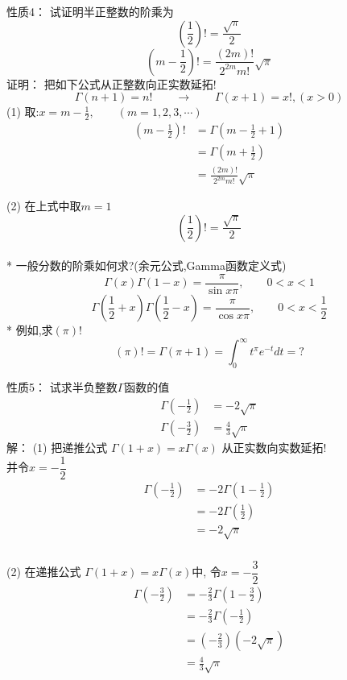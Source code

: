 \begin{frame}
	\alert{性质4：} 试证明半正整数的阶乘为
	\[(\frac{1}{2})! =  \frac{\sqrt{\pi}}{2}\]
	\[ (m-\frac{1}{2})! =\frac{(2m)!}{2^{2m} m!}\sqrt{\pi} \]
	\alert{证明：} 把如下公式从正整数向正实数延拓!
	\[\Gamma(n+1)=n!\qquad \to \qquad \Gamma(x+1)=x!, (x>0)\]
	(1) 取:$x=m-\frac{1}{2}, \qquad (m=1,2,3, \cdots )$
	\[ \begin{aligned}
		(m-\frac{1}{2})! &= \Gamma (m-\frac{1}{2}+1) \\
						 &= \Gamma (m+\frac{1}{2}) \\
						 &= \frac{(2m)!}{2^{2m} m!}\sqrt{\pi} 
	\end{aligned} \]
\end{frame}

\begin{frame}
	(2) 在上式中取$m=1$
	\[(\frac{1}{2})! =  \frac{\sqrt{\pi}}{2} \]
	~~ \\ \vspace{1em}
* 一般分数的阶乘如何求?(余元公式,Gamma函数定义式)
\[ \Gamma(x)  \Gamma(1-x) =\frac{\pi}{\sin x \pi}, \qquad  0<x<1 \]
\[ \Gamma(\frac{1}{2}+x)  \Gamma(\frac{1}{2}-x) =\frac{\pi}{\cos x \pi}, \qquad  0<x<\frac{1}{2} \]
 * 例如,求$(\pi) !$ 
 \[ (\pi)! = \Gamma(\pi +1 ) = \int_{0}^{\infty} t^{\pi} e^{-t} dt =? \]
\end{frame}

\begin{frame}
	\alert{性质5：} 试求半负整数$\Gamma$函数的值
	\begin{equation*}
		\begin{split}
		\Gamma(-\frac{1}{2}) &=-2\sqrt{\pi} \\ 
		\Gamma(-\frac{3}{2}) &=\frac{4}{3}\sqrt{\pi}
		\end{split}	
	\end{equation*}	
	\alert{解：} (1) 把递推公式 $\Gamma(1+x)=x \Gamma(x)$ 从正实数向实数延拓! \\
	并令$x=-\dfrac{1}{2}$\\
	\[
	\begin{aligned}
		 \Gamma(-\frac{1}{2})&= -2 \Gamma(1-\frac{1}{2})\\
		 &=-2 \Gamma(\frac{1}{2})\\
		 &=-2 \sqrt{\pi}
	\end{aligned}	
	\]
\end{frame}

\begin{frame}
	  \frametitle{}
	(2) 在递推公式 $\Gamma(1+x)=x \Gamma(x)$中, 令$x=-\dfrac{3}{2}$\\
	\[
	\begin{aligned}
		 \Gamma(-\frac{3}{2})&= -\frac{2}{3} \Gamma(1-\frac{3}{2})\\
		 &=-\frac{2}{3} \Gamma(-\frac{1}{2})\\
		 &=(-\frac{2}{3})(-2 \sqrt{\pi}) \\
		 &=\frac{4}{3}\sqrt{\pi} \\
	\end{aligned}	
	\] 
\end{frame}

